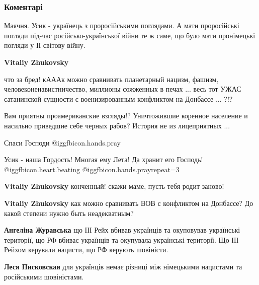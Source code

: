  
 
 
 
 
\subsubsection{Коментарі}
\label{sec:26_09_2021.fb.zhuravskaja_angelina.1.usik_radost_pobedy.cmt}

\begin{itemize} %

Маячня. Усик - українець з проросійськими поглядами. А мати проросійські
погляди під-час російсько-української війни те ж саме, що було мати пронімецькі
погляди у ІІ світову війну.

\begin{itemize} %
\textbf{Vitaliy Zhukovsky} 

что за бред! кАААк можно сравнивать планетарный нацизм, фашизм,
человеконенавистничество, миллионы сожженных в печах ... весь тот УЖАС
сатанинской сущности с военизированным конфликтом на Донбассе ... ?!?

Вам приятны проамериканские взгляды!? Уничтожившие коренное население и
насильно приведшие себе черных рабов? История не из лицеприятных ...

Спаси Господи  @igg{fbicon.hands.pray} 

Усик - наша Гордость! Многая ему Лета! Да хранит его Господь!  @igg{fbicon.heart.beating}  @igg{fbicon.hands.pray}{repeat=3} 

\textbf{Vitaliy Zhukovsky} конченный! скажи маме, пусть тебя родит заново!

\textbf{Vitaliy Zhukovsky} как можно сравнивать ВОВ с конфликтом на Донбассе? До какой степени нужно быть неадекватным?

\textbf{Ангеліна Журавська} що ІІІ Рейх вбивав українців та окуповував українські території, що РФ вбиває українців та окупувала українські території. Що ІІІ Рейхом керували нацисти, що РФ керують шовіністи.

\textbf{Леся Писковская} для українців немає різниці між німецькими нацистами та російськими шовіністами.


\end{itemize}
\end{itemize}
